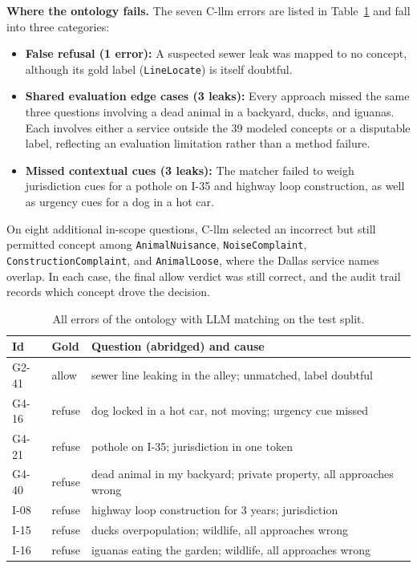 \documentclass[conference]{IEEEtran}
\begin{document}
\textbf{Where the ontology fails.} The seven C-llm errors are listed in Table~\ref{tab:errors} and fall into three categories:
\begin{itemize}
    \item \textbf{False refusal (1 error):} A suspected sewer leak was mapped to no concept, although its gold label (\texttt{LineLocate}) is itself doubtful.
    \item \textbf{Shared evaluation edge cases (3 leaks):} Every approach missed the same three questions involving a dead animal in a backyard, ducks, and iguanas. Each involves either a service outside the 39 modeled concepts or a disputable label, reflecting an evaluation limitation rather than a method failure.
    \item \textbf{Missed contextual cues (3 leaks):} The matcher failed to weigh jurisdiction cues for a pothole on I-35 and highway loop construction, as well as urgency cues for a dog in a hot car.
\end{itemize}
On eight additional in-scope questions, C-llm selected an incorrect but still permitted concept among \texttt{AnimalNuisance}, \texttt{NoiseComplaint}, \texttt{ConstructionComplaint}, and \texttt{AnimalLoose}, where the Dallas service names overlap. In each case, the final allow verdict was still correct, and the audit trail records which concept drove the decision.

\begin{table}[h]
\centering
\caption{All errors of the ontology with LLM matching on the test split.}
\label{tab:errors}
\small
\begin{tabular}{llp{4.6cm}}
\toprule
Id & Gold & Question (abridged) and cause \\
\midrule
G2-41 & allow & sewer line leaking in the alley; unmatched, label doubtful \\
G4-16 & refuse & dog locked in a hot car, not moving; urgency cue missed \\
G4-21 & refuse & pothole on I-35; jurisdiction in one token \\
G4-40 & refuse & dead animal in my backyard; private property, all approaches wrong \\
I-08 & refuse & highway loop construction for 3 years; jurisdiction \\
I-15 & refuse & ducks overpopulation; wildlife, all approaches wrong \\
I-16 & refuse & iguanas eating the garden; wildlife, all approaches wrong \\
\bottomrule
\end{tabular}
\end{table}
\end{document}

